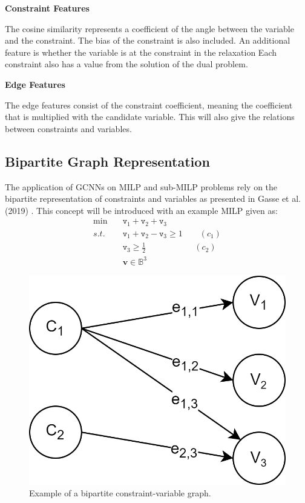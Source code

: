 \textbf{Constraint Features}

The cosine similarity represents a coefficient of the angle between the variable and the constraint.   
The bias of the constraint is also included. 
An additional feature is whether the variable is at the constraint in the relaxation
Each constraint also has a value from the solution of the dual problem. 


\textbf{Edge Features}

The edge features consist of the constraint coefficient, meaning the coefficient that is multiplied with the candidate variable. This will also give the relations between constraints and variables.




\subsection{Bipartite Graph Representation}

The application of \gls{GCNN}s on \gls{MILP} and sub-\gls{MILP} problems rely on the bipartite representation of constraints and variables as presented in Gasse et al. (2019) \cite{gasse2019exact}.
This concept will be introduced with an example \gls{MILP} given as:
\begin{align}\label{eq:bipex}
    \min \quad &\texttt{v}_1 + \texttt{v}_2 + \texttt{v}_3\\ 
    s.t. \quad &\texttt{v}_1 + \texttt{v}_2 - \texttt{v}_3 \geq 1 \qquad (c_1)\nonumber\\
    &\texttt{v}_3 \geq \frac{1}{2}\qquad\qquad\quad\;\,\; (c_2)\nonumber\\
    &\mathbf{v} \in \mathbb{B}^3 \nonumber
\end{align}

\begin{figure}
    \centering
    \includegraphics[width=0.40\linewidth]{img/bipartite_zoom.png}
    \caption{Example of a bipartite constraint-variable graph.}
    \label{fig:bipartite_cv}
\end{figure}

